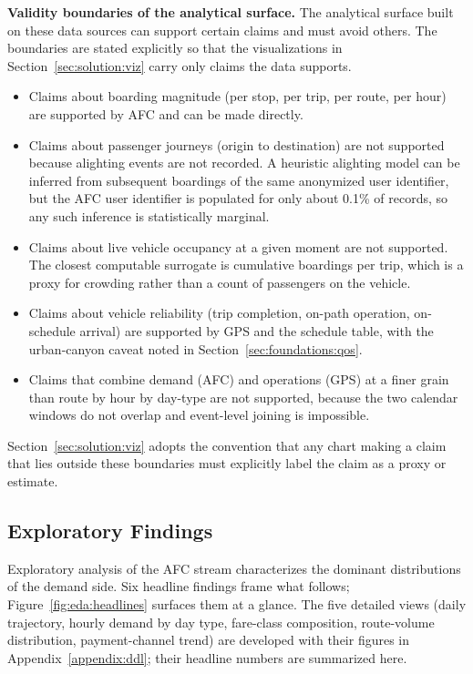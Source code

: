 \label{sec:solution:validity}
\noindent\textbf{Validity boundaries of the analytical surface.} The
analytical surface built on these data sources can support certain claims
and must avoid others. The boundaries are stated explicitly so that the
visualizations in Section~\ref{sec:solution:viz} carry only claims the
data supports.

\begin{itemize}
\item Claims about boarding magnitude (per stop, per trip, per route, per hour) are supported by AFC and can be made directly.
\item Claims about passenger journeys (origin to destination) are not supported because alighting events are not recorded. A heuristic alighting model can be inferred from subsequent boardings of the same anonymized user identifier, but the AFC user identifier is populated for only about 0.1\% of records, so any such inference is statistically marginal.
\item Claims about live vehicle occupancy at a given moment are not supported. The closest computable surrogate is cumulative boardings per trip, which is a proxy for crowding rather than a count of passengers on the vehicle.
\item Claims about vehicle reliability (trip completion, on-path operation, on-schedule arrival) are supported by GPS and the schedule table, with the urban-canyon caveat noted in Section~\ref{sec:foundations:qos}.
\item Claims that combine demand (AFC) and operations (GPS) at a finer grain than route by hour by day-type are not supported, because the two calendar windows do not overlap and event-level joining is impossible.
\end{itemize}

Section~\ref{sec:solution:viz} adopts the convention that any chart making
a claim that lies outside these boundaries must explicitly label the claim
as a proxy or estimate.

\subsection{Exploratory Findings}
\label{sec:solution:dataset:eda}

Exploratory analysis of the AFC stream characterizes the dominant
distributions of the demand side. Six headline findings frame what
follows; Figure~\ref{fig:eda:headlines} surfaces them at a glance. The
five detailed views (daily trajectory, hourly demand by day type,
fare-class composition, route-volume distribution, payment-channel
trend) are developed with their figures in
Appendix~\ref{appendix:ddl}; their headline numbers are summarized
here.

